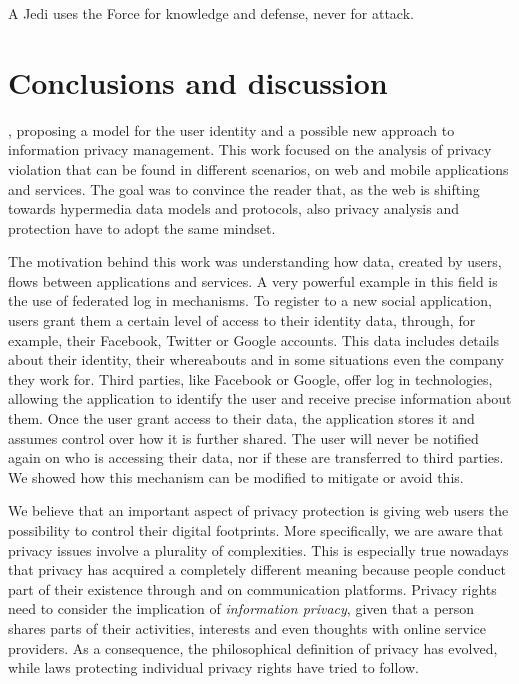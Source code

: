 \begin{savequote}[75mm] 
A Jedi uses the Force for knowledge and defense, never for attack.
\end{savequote}

\chapter{Conclusions and discussion}

, proposing a model for the user identity and a possible new approach to information privacy management. This work focused on the analysis of privacy violation that can be found in different scenarios, on web and mobile applications and services.
The goal was to convince the reader that, as the web is shifting towards hypermedia data models and protocols, also privacy analysis and protection have to adopt the same mindset.

The motivation behind this work was understanding how data, created by users, flows between applications and services. A very powerful example in this field is the use of federated log in mechanisms. To register to a new social application, users grant them a certain level of access to their identity data, through, for example, their Facebook, Twitter or Google accounts. This data includes details about their identity, their whereabouts and in some situations even the company they work for. Third parties, like Facebook or Google, offer log in technologies, allowing the application to identify the user and receive precise information about them. Once the user grant access to their data, the application stores it and assumes control over how it is further shared. The user will never be notified again on who is accessing their data, nor if these are transferred to third parties. We showed how this mechanism can be modified to mitigate or avoid this.

We believe that an important aspect of privacy protection is giving web users the possibility to control their digital footprints. More specifically, we are aware that privacy issues involve a plurality of complexities. This is especially true nowadays that privacy has acquired a completely different meaning because people conduct part of their existence through and on communication platforms. Privacy rights need to consider the implication of \emph{information privacy}, given that a person shares parts of their activities, interests and even thoughts with online service providers. As a consequence, the philosophical definition of privacy has evolved, while laws protecting individual privacy rights have tried to follow.

